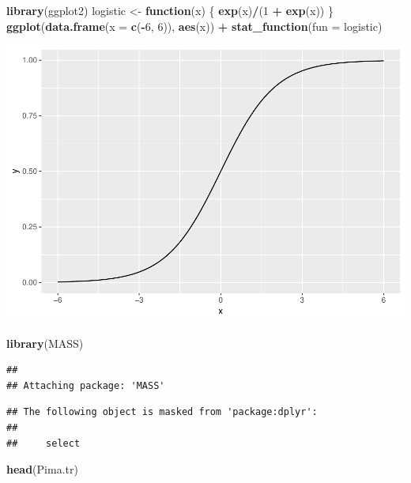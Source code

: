 \documentclass[]{article}
\newenvironment{Shaded}{\begin{snugshade}}{\end{snugshade}}
\newcommand{\KeywordTok}[1]{\textcolor[rgb]{0.13,0.29,0.53}{\textbf{#1}}}
\newcommand{\DataTypeTok}[1]{\textcolor[rgb]{0.13,0.29,0.53}{#1}}
\newcommand{\DecValTok}[1]{\textcolor[rgb]{0.00,0.00,0.81}{#1}}
\newcommand{\StringTok}[1]{\textcolor[rgb]{0.31,0.60,0.02}{#1}}
\newcommand{\ControlFlowTok}[1]{\textcolor[rgb]{0.13,0.29,0.53}{\textbf{#1}}}
\newcommand{\OperatorTok}[1]{\textcolor[rgb]{0.81,0.36,0.00}{\textbf{#1}}}
\newcommand{\NormalTok}[1]{#1}
\begin{document}
\begin{Shaded}
\begin{Highlighting}[]
\KeywordTok{library}\NormalTok{(ggplot2)}
\NormalTok{logistic <-}\StringTok{ }\ControlFlowTok{function}\NormalTok{(x) \{}
    \KeywordTok{exp}\NormalTok{(x)}\OperatorTok{/}\NormalTok{(}\DecValTok{1} \OperatorTok{+}\StringTok{ }\KeywordTok{exp}\NormalTok{(x))}
\NormalTok{\}}
\KeywordTok{ggplot}\NormalTok{(}\KeywordTok{data.frame}\NormalTok{(}\DataTypeTok{x =} \KeywordTok{c}\NormalTok{(}\OperatorTok{-}\DecValTok{6}\NormalTok{, }\DecValTok{6}\NormalTok{)), }\KeywordTok{aes}\NormalTok{(x)) }\OperatorTok{+}\StringTok{ }\KeywordTok{stat_function}\NormalTok{(}\DataTypeTok{fun =}\NormalTok{ logistic)}
\end{Highlighting}
\end{Shaded}

\includegraphics{stt-301-programming_files/figure-latex/unnamed-chunk-155-1.pdf}

\begin{Shaded}
\begin{Highlighting}[]
\KeywordTok{library}\NormalTok{(MASS)}
\end{Highlighting}
\end{Shaded}

\begin{verbatim}
## 
## Attaching package: 'MASS'
\end{verbatim}

\begin{verbatim}
## The following object is masked from 'package:dplyr':
## 
##     select
\end{verbatim}

\begin{Shaded}
\begin{Highlighting}[]
\KeywordTok{head}\NormalTok{(Pima.tr)}
\end{Highlighting}
\end{Shaded}
\end{document}
